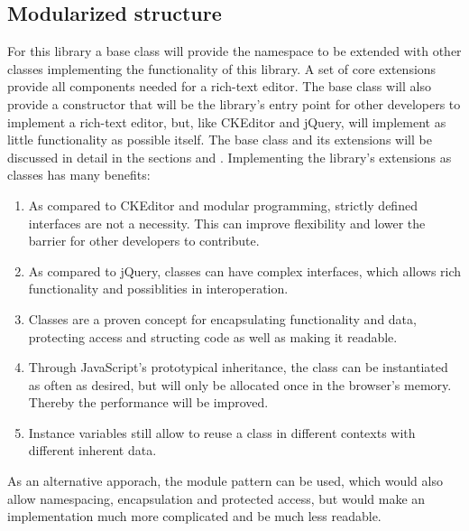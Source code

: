 
\subsection{Modularized structure} For this library a base class will provide the namespace to be extended with other classes implementing the functionality of this library. A set of core extensions provide all components needed for a rich-text editor. The base class will also provide a constructor that will be the library's entry point for other developers to implement a rich-text editor, but, like CKEditor and jQuery, will implement as little functionality as possible itself. The base class and its extensions will be discussed in detail in the sections  and . Implementing the library's extensions as classes has many benefits:

\begin{enumerate}
\item As compared to CKEditor and modular programming, strictly defined interfaces are not a necessity. This can improve flexibility and lower the barrier for other developers to contribute. %
\item As compared to jQuery, classes can have complex interfaces, which allows rich functionality and possiblities in interoperation.
\item Classes are a proven concept for encapsulating functionality and data, protecting access and structing code as well as making it readable.
\item Through JavaScript's prototypical inheritance, the class can be instantiated as often as desired, but will only be allocated once in the browser's memory. Thereby the performance will be improved.
\item Instance variables still allow to reuse a class in different contexts with different inherent data. %
\end{enumerate}

As an alternative apporach, the module pattern can be used, which would also allow namespacing, encapsulation and protected access, but would make an implementation much more complicated and be much less readable.



